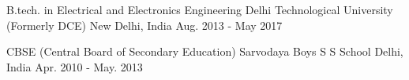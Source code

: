 


\begin{cventries}


\cventry
{B.tech. in Electrical and Electronics Engineering} %
{Delhi Technological University (Formerly DCE)} %
{New Delhi, India} %
{Aug. 2013 - May 2017} %
{}

\end{cventries}

\begin{cventries}

\vspace{-5mm}
\cventry
{CBSE (Central Board of Secondary Education)} %
{Sarvodaya Boys S S School} %
{Delhi, India} %
{Apr. 2010 - May. 2013} %
{}

\end{cventries}

